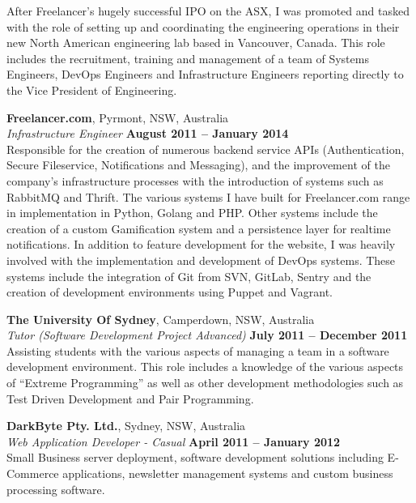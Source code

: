 \documentclass[margin,line]{resume}
\begin{document}
\begin{resume}
        After Freelancer's hugely successful IPO on the ASX, I was promoted and tasked with the role of setting up and coordinating
    the engineering operations in their new North American engineering lab based in Vancouver, Canada. This role includes the 
    recruitment, training and management of a team of Systems Engineers, DevOps Engineers and Infrastructure Engineers reporting directly
    to the Vice President of Engineering.

    \textbf{Freelancer.com}, Pyrmont, NSW, Australia \vspace{2mm}\\\vspace{1mm}%
    \textsl{Infrastructure Engineer} \hfill \textbf{August 2011 -- January 2014}\\
    Responsible for the creation of numerous backend service APIs (Authentication, Secure Fileservice, Notifications and Messaging),
    and the improvement of the company's infrastructure processes with the introduction of systems such as
    RabbitMQ and Thrift. The various systems I have built for Freelancer.com range in implementation in Python, Golang and PHP.
    Other systems include the creation of a custom Gamification system and a persistence layer for realtime notifications. 
    In addition to feature development for the website, I was heavily involved with the implementation and development of DevOps systems. 
    These systems include the integration of Git from SVN, GitLab, Sentry and the creation of development environments using Puppet and Vagrant.
   
    \textbf{The University Of Sydney}, Camperdown, NSW, Australia \vspace{2mm}\\\vspace{1mm}%
    \textsl{Tutor (Software Development Project Advanced)} \hfill \textbf{July 2011 -- December 2011}\\
    Assisting students with the various aspects of managing a team in a software development environment.
    This role includes a knowledge of the various aspects of ``Extreme Programming'' as well as other development
    methodologies such as Test Driven Development and Pair Programming.

    \textbf{DarkByte Pty. Ltd.}, Sydney, NSW, Australia \vspace{2mm}\\\vspace{1mm}%
    \textsl{Web Application Developer - Casual} \hfill \textbf{April 2011 -- January 2012}\\
    Small Business server deployment, software development solutions including E-Commerce applications,
    newsletter management systems and custom business processing software.	


\end{resume}
\end{document}
